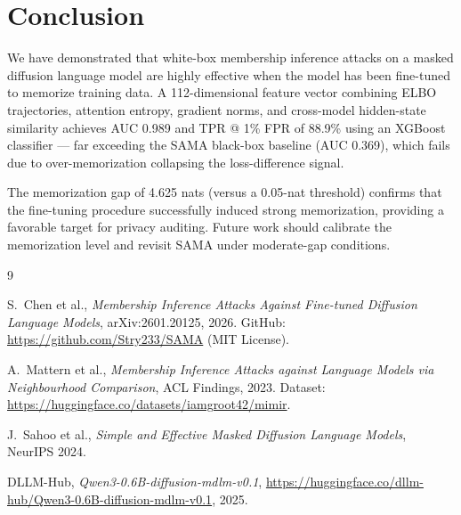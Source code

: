\documentclass[11pt,a4paper]{article}
\begin{document}
\section{Conclusion}

We have demonstrated that white-box membership inference attacks on a masked
diffusion language model are highly effective when the model has been
fine-tuned to memorize training data.  A 112-dimensional feature vector
combining ELBO trajectories, attention entropy, gradient norms, and
cross-model hidden-state similarity achieves AUC 0.989 and TPR @ 1\% FPR of
88.9\% using an XGBoost classifier --- far exceeding the SAMA black-box
baseline (AUC 0.369), which fails due to over-memorization collapsing the
loss-difference signal.

The memorization gap of 4.625 nats (versus a 0.05-nat threshold) confirms
that the fine-tuning procedure successfully induced strong memorization,
providing a favorable target for privacy auditing.  Future work should
calibrate the memorization level and revisit SAMA under moderate-gap
conditions.


\begin{thebibliography}{9}

S.~Chen et al.,
\textit{Membership Inference Attacks Against Fine-tuned Diffusion Language Models},
arXiv:2601.20125, 2026.
GitHub: \url{https://github.com/Stry233/SAMA} (MIT License).

A.~Mattern et al.,
\textit{Membership Inference Attacks against Language Models via Neighbourhood Comparison},
ACL Findings, 2023.
Dataset: \url{https://huggingface.co/datasets/iamgroot42/mimir}.

J.~Sahoo et al.,
\textit{Simple and Effective Masked Diffusion Language Models},
NeurIPS 2024.

DLLM-Hub,
\textit{Qwen3-0.6B-diffusion-mdlm-v0.1},
\url{https://huggingface.co/dllm-hub/Qwen3-0.6B-diffusion-mdlm-v0.1}, 2025.

\end{thebibliography}
\end{document}
